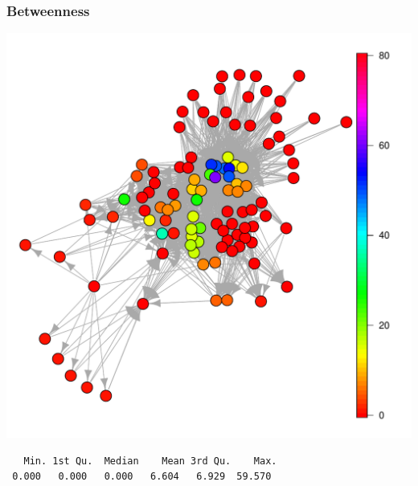 \documentclass[compress,10pt]{beamer}
\begin{document}
\begin{frame}[fragile]
 \frametitle{Betweenness}
 
 \begin{center}
  \includegraphics[scale=.3]{plots/chilean_between.pdf}
 \end{center}

\begin{verbatim}
   Min. 1st Qu.  Median    Mean 3rd Qu.    Max. 
 0.000   0.000   0.000   6.604   6.929  59.570
\end{verbatim} 
 
\end{frame}

\end{document}

